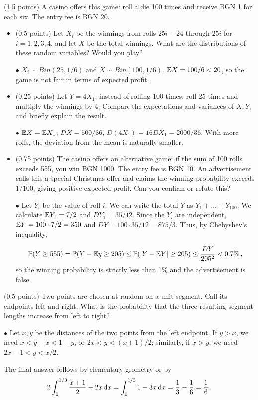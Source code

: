 \documentclass[a4paper]{report}
\begin{document}
\begin{problem} (1.5 points)
A casino offers this game: roll a die 100 times and receive BGN 1 for each six. The entry fee is BGN 20.

\begin{itemize}
    \item (0.5 points) Let
$X_i$ be the winnings from rolls $25i-24$ through $25i$
for $i=1,2,3,4$, and let $X$ be the total winnings. What are the distributions of these
random variables? Would you play?

$\bullet$ $X_i\sim Bin(25,1/6)$ and $X\sim Bin(100,1/6)$. $\mathbb {E} X=100/6<20$, so
the game is not fair in terms of expected profit.

\item (0.25 points) Let $Y=4X_1$: instead of rolling 100 times, roll 25 times and multiply
the winnings by 4. Compare the expectations and variances of $X,Y$, and briefly explain
the result.

$\bullet$
$\mathbb {E} X=\mathbb {E} X_1$, $D X=500/36$, $D(4X_1)=16D X_1=2000/36$. With more
rolls, the deviation from the mean is naturally smaller.

\item (0.75 points)
The casino offers an alternative game: if the sum of 100 rolls exceeds 555, you win BGN 1000. The entry fee is BGN 10.
An advertisement calls this a special Christmas offer and claims the winning probability exceeds $1/100$, giving positive expected profit. Can you confirm or refute this?

$\bullet$ Let $Y_i$ be the value of roll $i$. We can
write the total $Y$ as $Y_1+\dots+Y_{100}$. We calculate
$\mathbb {E} Y_1=7/2$ and $D Y_1=35/12$. Since the $Y_i$ are independent,
$\mathbb {E} Y=100\cdot7/2=350$ and $D Y=100\cdot35/12=875/3$. Thus,
by Chebyshev's inequality,

\[
\mathbb P(Y \geq 555) = \mathbb P(Y - \mathbb {E} y \geq 205) \leq \mathbb P(|Y - \mathbb {E} Y| \geq 205)
\leq \frac{D Y}{205^2} < 0.7\% \, ,
\]
so the winning probability is strictly less than 1\% and the advertisement is false.



\end{itemize}


\end{problem}

\begin{problem} (0.5 points)
Two points are chosen at random on a unit segment. Call its endpoints left and right. What is the probability
that the three resulting segment lengths increase from left to right?
\end{problem}

$\bullet$ Let $x,y$ be the distances of the two points from the left endpoint. If
$y>x$, we need $x<y-x<1-y$, or $2x<y<(x+1)/2$; similarly, if $x>y$, we need $2x-1<y<x/2$.

The final answer follows by elementary geometry or by
\[
2 \int_0^{1/3} \frac{x+1}{2} - 2x \, \mathrm{d} x = \int_0^{1/3} 1- 3x \, \mathrm{d} x
= \frac13 - \frac16 = \frac16 \, .
\]

\begin{center}

\end{center}
\end{document}
